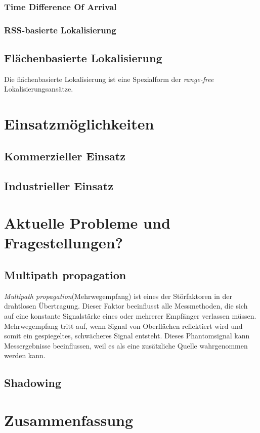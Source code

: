 \documentclass[12pt, a4wide]{scrreprt}
\begin{document}
    \subsection{Time Difference Of Arrival}
    \subsection{RSS-basierte Lokalisierung}    
  \section{Flächenbasierte Lokalisierung}
Die flächenbasierte Lokalisierung ist eine Spezialform der \textit{range-free} Lokalisierungsansätze.
\chapter{Einsatzmöglichkeiten}
  \section{Kommerzieller Einsatz}
  \section{Industrieller Einsatz}

\chapter{Aktuelle Probleme und Fragestellungen?}
  \section{Multipath propagation}
\textit{Multipath propagation}(Mehrwegempfang) ist eines der Störfaktoren in der drahtlosen Übertragung. Dieser Faktor beeinflusst alle Messmethoden, die sich auf eine konstante Signalstärke eines oder mehrerer Empfänger verlassen müssen. Mehrwegempfang tritt auf, wenn Signal von Oberflächen reflektiert wird und somit ein gespiegeltes, schwächeres Signal entsteht. Dieses Phantomsignal kann Messergebnisse beeinflussen, weil es als eine zusätzliche Quelle wahrgenommen werden kann.
  \section{Shadowing}

\chapter{Zusammenfassung}

\newpage

\pagestyle{empty}

\nocite{*}
\end{document}
